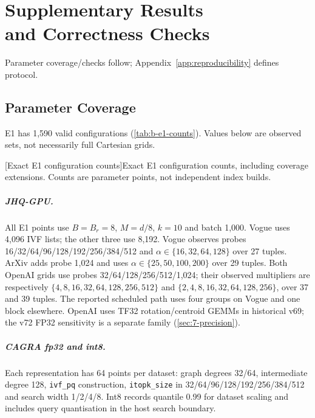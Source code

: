 \chapter[Supplementary Results and Correctness Checks]{Supplementary Results\\and Correctness Checks}
\label{app:supplementary}
Parameter coverage/checks follow; Appendix~\ref{app:reproducibility} defines protocol.

\section{Parameter Coverage}
\label{sec:b-grids}
E1 has 1,590 valid configurations (\cref{tab:b-e1-counts}). Values below are observed sets, not necessarily full Cartesian grids.

\par\medskip\noindent\begin{minipage}{\linewidth}
\centering\captionsetup{hypcap=false}
[Exact E1 configuration counts]{Exact E1 configuration counts, including coverage
extensions. Counts are parameter points, not independent index builds.}
\label{tab:b-e1-counts}
\footnotesize\setlength{\tabcolsep}{4pt}

\end{minipage}\par\medskip

\begingroup\raggedright
\paragraph{JHQ-GPU.}
All E1 points use $B=B_r=8$, $M=d/8$, $k=10$ and batch 1,000.
Vogue uses 4,096 IVF lists; the other three use 8,192.
Vogue observes probes 16/\allowbreak{}32/\allowbreak{}64/\allowbreak{}96/\allowbreak{}128/\allowbreak{}192/\allowbreak{}256/\allowbreak{}384/\allowbreak{}512 and
$\alpha\in\{16,32,64,128\}$ over 27 tuples. ArXiv adds probe 1,024
and uses $\alpha\in\{25,50,100,200\}$ over 29 tuples.
Both OpenAI grids use probes 32/\allowbreak{}64/\allowbreak{}128/\allowbreak{}256/\allowbreak{}512/\allowbreak{}1,024;
their observed multipliers are respectively
$\{4,8,16,32,64,128,256,512\}$ and
$\{2,4,8,16,32,64,128,256\}$, over 37 and 39 tuples.
The reported scheduled path uses four groups on Vogue and one block
elsewhere. OpenAI uses TF32 rotation/centroid GEMMs in historical v69;
the v72 FP32 sensitivity is a separate family (\cref{sec:7-precision}).

\paragraph{CAGRA fp32 and int8.}
Each representation has 64 points per dataset: graph degrees 32/\allowbreak{}64,
intermediate degree 128, \texttt{ivf\_pq} construction,
\texttt{itopk\_size} in 32/\allowbreak{}64/\allowbreak{}96/\allowbreak{}128/\allowbreak{}192/\allowbreak{}256/\allowbreak{}384/\allowbreak{}512 and search width
1/\allowbreak{}2/\allowbreak{}4/\allowbreak{}8. Int8 records quantile 0.99 for dataset scaling and includes
query quantisation in the host search boundary.

